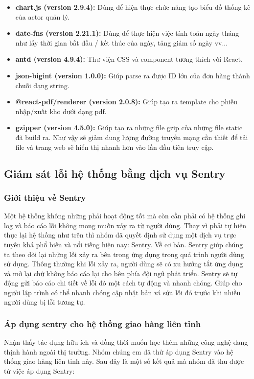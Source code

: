 			\begin{itemize}
				\item \textbf{chart.js (version 2.9.4):} Dùng để hiện thực chức năng tạo biểu đồ thống kê của actor quản lý.
				\item \textbf{date-fns (version 2.21.1):} Dùng để thực hiện việc tính toán ngày tháng như lấy thời gian bắt đầu / kết thúc của ngày, tăng giảm số ngày vv...
				\item \textbf{antd (version 4.9.4):} Thư viện CSS và component tương thích với React.
				\item \textbf{json-bigint (version 1.0.0):} Giúp parse ra được ID lớn của đơn hàng thành chuỗi dạng string.
				\item \textbf{@react-pdf/renderer (version 2.0.8):} Giúp tạo ra template cho phiếu nhập/xuất kho dưới dạng pdf.
				\item \textbf{gzipper (version 4.5.0):} Giúp tạo ra những file gzip của những file static đã build ra. Như vậy sẽ giảm dung lượng đường truyền mạng cần thiết để tải file và trang web sẽ hiển thị nhanh hơn vào lần đầu tiên truy cập.
			\end{itemize}
			
	
		\subsection{Giám sát lỗi hệ thống bằng dịch vụ Sentry}
			\subsubsection{Giới thiệu về Sentry}
				Một hệ thống không những phải hoạt động tốt mà còn cần phải có hệ thống ghi log và báo cáo lỗi không mong muốn xảy ra từ người dùng. Thay vì phải tự hiện thực lại hệ thống như trên thì nhóm đã quyết định sử dụng một dịch vụ trực tuyến khá phổ biến và nổi tiếng hiện nay: Sentry. Về cơ bản. Sentry giúp chúng ta theo dõi lại những lỗi xảy ra bên trong ứng dụng trong quá trình người dùng sử dụng. Thông thường khi lỗi xảy ra, người dùng sẽ có xu hướng tắt ứng dụng và mở lại chứ không báo cáo lại cho bên phía đội ngũ phát triển. Sentry sẽ tự động gửi báo cáo chi tiết về lỗi đó một cách tự động và nhanh chóng. Giúp cho người lập trình có thể nhanh chóng cập nhật bản vá sửa lỗi đó trước khi nhiều người dùng bị lỗi tương tự.
				
			\subsubsection{Áp dụng sentry cho hệ thống giao hàng liên tỉnh}
			 	Nhận thấy tác dụng hữu ích và đồng thời muốn học thêm những công nghệ đang thịnh hành ngoài thị trường. Nhóm chúng em đã thử áp dụng Sentry vào hệ thống giao hàng liên tỉnh này. Sau đây là một số kết quả mà nhóm đã thu được từ việc áp dụng Sentry:
			 	

